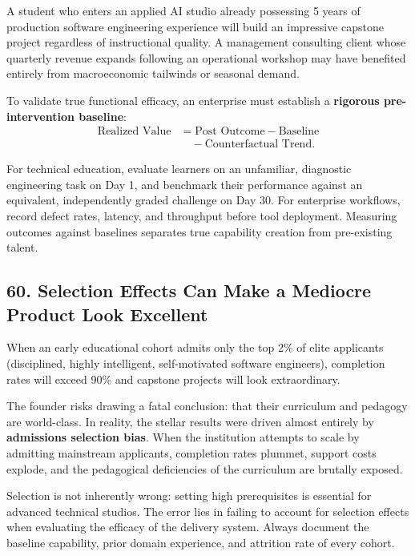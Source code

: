 A student who enters an applied AI studio already possessing 5 years of production software engineering experience will build an impressive capstone project regardless of instructional quality. A management consulting client whose quarterly revenue expands following an operational workshop may have benefited entirely from macroeconomic tailwinds or seasonal demand.

To validate true functional efficacy, an enterprise must establish a \textbf{rigorous pre-intervention baseline}:
\begin{equation}
\begin{aligned}
\text{Realized Value} &= \text{Post Outcome} - \text{Baseline} \\
&\quad - \text{Counterfactual Trend}.
\end{aligned}
\end{equation}

For technical education, evaluate learners on an unfamiliar, diagnostic engineering task on Day 1, and benchmark their performance against an equivalent, independently graded challenge on Day 30. For enterprise workflows, record defect rates, latency, and throughput before tool deployment. Measuring outcomes against baselines separates true capability creation from pre-existing talent.

\subsection*{60. Selection Effects Can Make a Mediocre Product Look Excellent}

When an early educational cohort admits only the top 2\% of elite applicants (disciplined, highly intelligent, self-motivated software engineers), completion rates will exceed 90\% and capstone projects will look extraordinary.

The founder risks drawing a fatal conclusion: that their curriculum and pedagogy are world-class. In reality, the stellar results were driven almost entirely by \textbf{admissions selection bias}. When the institution attempts to scale by admitting mainstream applicants, completion rates plummet, support costs explode, and the pedagogical deficiencies of the curriculum are brutally exposed.

Selection is not inherently wrong: setting high prerequisites is essential for advanced technical studios. The error lies in failing to account for selection effects when evaluating the efficacy of the delivery system. Always document the baseline capability, prior domain experience, and attrition rate of every cohort.
